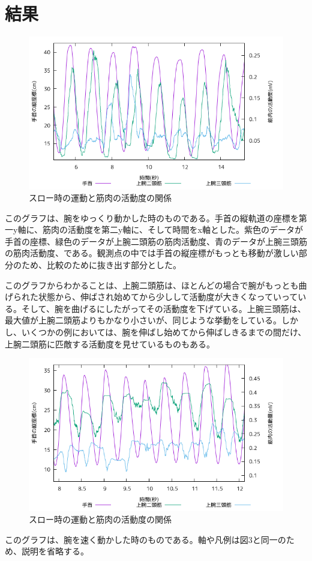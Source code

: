\documentclass{jsarticle}
\begin{document}
\section{結果}
\begin{figure}[h]
\begin{center}
\includegraphics[width=16cm]{images/s1proto.png}
\end{center}
\caption{スロー時の運動と筋肉の活動度の関係}
\label{fig three}
\end{figure}
このグラフは、腕をゆっくり動かした時のものである。手首の縦軌道の座標を第一y軸に、筋肉の活動度を第二y軸に、そして時間をx軸とした。紫色のデータが手首の座標、緑色のデータが上腕二頭筋の筋肉活動度、青のデータが上腕三頭筋の筋肉活動度、である。観測点の中では手首の縦座標がもっとも移動が激しい部分のため、比較のために抜き出す部分とした。

このグラフからわかることは、上腕二頭筋は、ほとんどの場合で腕がもっとも曲げられた状態から、伸ばされ始めてから少しして活動度が大きくなっていっている。そして、腕を曲げるにしたがってその活動度を下げている。上腕三頭筋は、最大値が上腕二頭筋よりもかなり小さいが、同じような挙動をしている。しかし、いくつかの例においては、腕を伸ばし始めてから伸ばしきるまでの間だけ、上腕二頭筋に匹敵する活動度を見せているものもある。

\newpage
\begin{figure}[h]
\begin{center}
\includegraphics[width=16cm]{images/s2proto.png}
\end{center}
\caption{スロー時の運動と筋肉の活動度の関係}
\label{fig four }
\end{figure}
このグラフは、腕を速く動かした時のものである。軸や凡例は図3と同一のため、説明を省略する。
\end{document}
